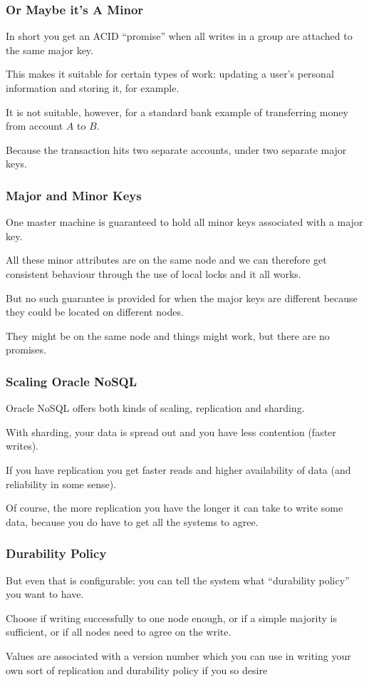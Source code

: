 \begin{frame}
\frametitle{Or Maybe it's A Minor}

In short you get an ACID ``promise'' when all writes in a group are attached to the same major key. 

This makes it suitable for certain types of work: updating a user's personal information and storing it, for example. 

It is not suitable, however, for a standard bank example of transferring money from account $A$ to $B$. 

Because the transaction hits two separate accounts, under two separate major keys. 

\end{frame}



\begin{frame}
\frametitle{Major and Minor Keys}

One master machine is guaranteed to hold all minor keys associated with a major key.

All these minor attributes are on the same node and we can therefore get consistent behaviour through the use of local locks and it all works. 
 
But no such guarantee is provided for when the major keys are different because they could be located on different nodes. 
 
They might be on the same node and things might work, but there are no promises. 

\end{frame}



\begin{frame}
\frametitle{Scaling Oracle NoSQL}

Oracle NoSQL offers both kinds of scaling, replication and sharding. 

With sharding, your data is spread out and you have less contention (faster writes). 

If you have replication you get faster reads and higher availability of data (and reliability in some sense). 

Of course, the more replication you have the longer it can take to write some data, because you do have to get all the systems to agree. 

\end{frame}



\begin{frame}
\frametitle{Durability Policy}

But even that is configurable: you can tell the system what ``durability policy'' you want to have. 

Choose if writing successfully to one node enough, or if a simple majority is sufficient, or if all nodes need to agree on the write. 

Values are associated with a version number which you can use in writing your own sort of replication and durability policy if you so desire

\end{frame}



